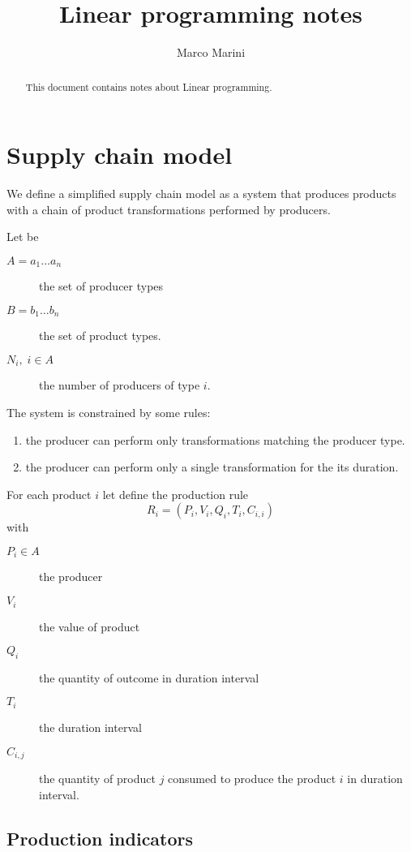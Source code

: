\documentclass[a4paper,11pt]{article}
\title{Linear programming notes}
\author{Marco Marini}
\begin{document}
\maketitle
\tableofcontents

\begin{abstract}
This document contains notes about Linear programming.
\end{abstract}

\section{Supply chain model}

We define a simplified supply chain model as a system
that produces products with a chain of product transformations performed by producers.

Let be
\begin{description}
	\item [$ A = a_1 \dots a_n $] the set of producer types
	\item [$ B = b_1 \dots b_n $] the set of product types.
	\item [$  N_i , \;i \in A $] the number of producers of type $ i $.
\end{description}

The system is constrained by some rules:
\begin{enumerate}
	\item the producer can perform only transformations
	matching the producer type.
	\item the producer can perform only a single
	transformation for the its duration.
\end{enumerate}

For each product $ i $ let define the production rule
\[ R_i = (P_i, V_i, Q_i, T_i, C_{i,i}) \]
with
\begin{description}
	\item[$ P_i \in A $ ] the producer
	\item[$ V_i $ ] the value of product
	\item[$ Q_i $ ] the quantity of outcome in duration interval
	\item[$ T_i $ ] the duration interval
	\item[$ C_{i,j} $ ] the quantity of product $ j $ consumed to produce the product $ i $  in duration interval.
\end{description}

\subsection{Production indicators}
\end{document}
